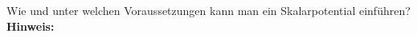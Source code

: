 \begin{question}[section=3,subsection=31,name={Elektrostatisches Skalarpotential},difficulty=2,type=mdl,tags={}]
	Wie und unter welchen Voraussetzungen kann man ein Skalarpotential einführen?
	\\ \textbf{Hinweis:}\\
	
\end{question}
\begin{solution}
	
\end{solution}